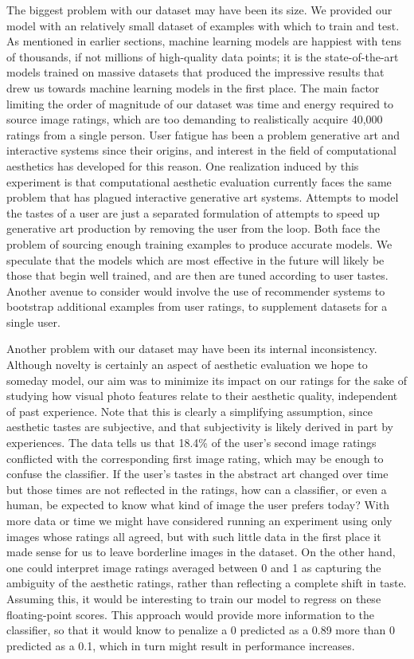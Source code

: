 \documentclass[midd]{thesis}
\begin{document}
The biggest problem with our dataset may have been its size. We provided our model with an relatively small dataset of examples with which to train and test. As mentioned in earlier sections, machine learning models are happiest with tens of thousands, if not millions of high-quality data points; it is the state-of-the-art models trained on massive datasets that produced the impressive results that drew us towards machine learning models in the first place. The main factor limiting the order of magnitude of our dataset was time and energy required to source image ratings, which are too demanding to realistically acquire 40,000 ratings from a single person. User fatigue has been a problem generative art and interactive systems since their origins, and interest in the field of computational aesthetics has developed for this reason. One realization induced by this experiment is that computational aesthetic evaluation currently faces the same problem that has plagued interactive generative art systems. Attempts to model the tastes of a user are just a separated formulation of attempts to speed up generative art production by removing the user from the loop. Both face the problem of sourcing enough training examples to produce accurate models. We speculate that the models which are most effective in the future will likely be those that begin well trained, and are then are tuned according to user tastes. Another avenue to consider would involve the use of recommender systems to bootstrap additional examples from user ratings, to supplement datasets for a single user.

Another problem with our dataset may have been its internal inconsistency. Although novelty is certainly an aspect of aesthetic evaluation we hope to someday model, our aim was to minimize its impact on our ratings for the sake of studying how visual photo features relate to their aesthetic quality, independent of past experience. Note that this is clearly a simplifying assumption, since aesthetic tastes are subjective, and that subjectivity is likely derived in part by experiences. The data tells us that 18.4\% of the user's second image ratings conflicted with the corresponding first image rating, which may be enough to confuse the classifier. If the user's tastes in the abstract art changed over time but those times are not reflected in the ratings, how can a classifier, or even a human, be expected to know what kind of image the user prefers today? With more data or time we might have considered running an experiment using only images whose ratings all agreed, but with such little data in the first place it made sense for us to leave borderline images in the dataset. On the other hand, one could interpret image ratings averaged between 0 and 1 as capturing the ambiguity of the aesthetic ratings, rather than reflecting a complete shift in taste. Assuming this, it would be interesting to train our model to regress on these floating-point scores. This approach would provide more information to the classifier, so that it would know to penalize a 0 predicted as a 0.89 more than 0 predicted as a 0.1, which in turn might result in performance increases.
\end{document}
